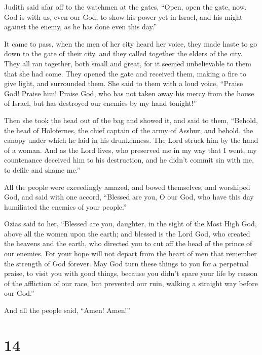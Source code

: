  Judith said afar off to the watchmen at the gates,
``Open, open the gate, now. God is with us, even our God, to show his
power yet in Israel, and his might against the enemy, as he has done
even this day.''

 It came to pass, when the men of her city heard her
voice, they made haste to go down to the gate of their city, and they
called together the elders of the city.  They all ran
together, both small and great, for it seemed unbelievable to them that
she had come. They opened the gate and received them, making a fire to
give light, and surrounded them.  She said to them with a
loud voice, ``Praise God! Praise him! Praise God, who has not taken away
his mercy from the house of Israel, but has destroyed our enemies by my
hand tonight!''

 Then she took the head out of the bag and showed it, and
said to them, ``Behold, the head of Holofernes, the chief captain of the
army of Asshur, and behold, the canopy under which he laid in his
drunkenness. The Lord struck him by the hand of a woman. 
And as the Lord lives, who preserved me in my way that I went, my
countenance deceived him to his destruction, and he didn't commit sin
with me, to defile and shame me.''

 All the people were exceedingly amazed, and bowed
themselves, and worshiped God, and said with one accord, ``Blessed are
you, O our God, who have this day humiliated the enemies of your
people.''

 Ozias said to her, ``Blessed are you, daughter, in the
sight of the Most High God, above all the women upon the earth; and
blessed is the Lord God, who created the heavens and the earth, who
directed you to cut off the head of the prince of our enemies.
 For your hope will not depart from the heart of men that
remember the strength of God forever.  May God turn these
things to you for a perpetual praise, to visit you with good things,
because you didn't spare your life by reason of the affliction of our
race, but prevented our ruin, walking a straight way before our God.''

And all the people said, ``Amen! Amen!''

\hypertarget{section-13}{%
\section{14}\label{section-13}}

